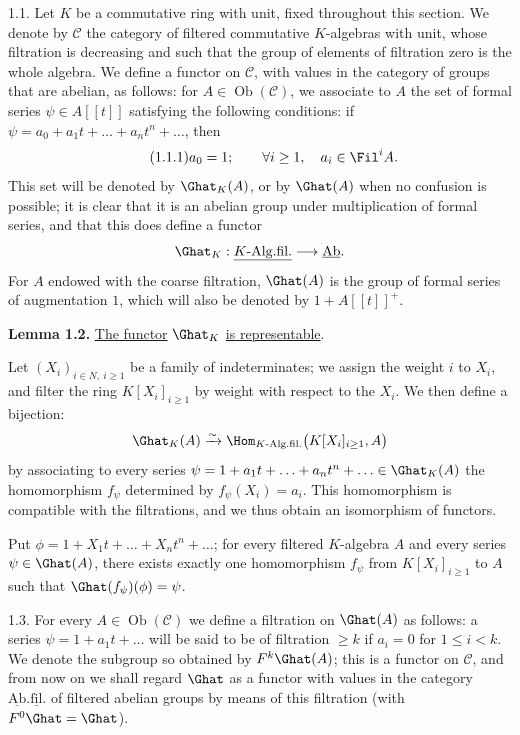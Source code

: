 1.1. Let \(K\) be a commutative ring with unit, fixed throughout this section. We denote by \(\mathcal C\) the category of filtered commutative \(K\)-algebras with unit, whose filtration is decreasing and such that the group of elements of filtration zero is the whole algebra. We define a functor on \(\mathcal C\), with values in the category of groups
%
that are abelian, as follows: for \(A\in\operatorname{Ob}(\mathcal C)\), we associate to \(A\) the set of formal series \(\psi\in A[[t]]\) satisfying the following conditions: if \(\psi=a_0+a_1t+\ldots+a_nt^n+\ldots\), then
\begin{equation}\tag{1.1.1}
  a_0=1;\qquad \forall i\geq 1,\quad a_i\in\Fil^i A .
\end{equation}
This set will be denoted by \(\Ghat_K(A)\), or by \(\Ghat(A)\) when no confusion is possible; it is clear that it is an abelian group under multiplication of formal series, and that this does define a functor
\[
  \Ghat_K:\underline{K\text{-Alg.fil.}}\longrightarrow \underline{\mathrm{Ab}}.
\]
For \(A\) endowed with the coarse filtration, \(\Ghat(A)\) is the group of formal series of augmentation \(1\), which will also be denoted by \(1+A[[t]]^+\).

\textbf{Lemma 1.2.} \uline{The functor} \(\Ghat_K\) \uline{is representable}.

Let \((X_i)_{i\in N,\ i\geq 1}\) be a family of indeterminates; we assign the weight \(i\) to \(X_i\), and filter the ring \(K[X_i]_{i\geq 1}\) by weight with respect to the \(X_i\). We then define a bijection:
\[
  \Ghat_K(A)\xrightarrow{\sim}
  \Hom_{K\text{-Alg.fil.}}\bigl(K[X_i]_{i\geq 1},A\bigr)
\]
by associating to every series \(\psi=1+a_1t+\ldots+a_nt^n+\ldots\in\Ghat_K(A)\) the homomorphism \(f_\psi\) determined by \(f_\psi(X_i)=a_i\). This homomorphism is compatible with the filtrations, and we thus obtain an isomorphism of functors.

Put \(\phi=1+X_1t+\ldots+X_nt^n+\ldots\); for every filtered \(K\)-algebra \(A\) and every series \(\psi\in\Ghat(A)\), there exists exactly one homomorphism
%
\(f_\psi\) from \(K[X_i]_{i\geq 1}\) to \(A\) such that \(\Ghat(f_\psi)(\phi)=\psi\).

1.3. For every \(A\in\operatorname{Ob}(\mathcal C)\) we define a filtration on \(\Ghat(A)\) as follows: a series \(\psi=1+a_1t+\ldots\) will be said to be of filtration \(\geq k\) if \(a_i=0\) for \(1\leq i<k\). We denote the subgroup so obtained by \(F^k\Ghat(A)\); this is a functor on \(\mathcal C\), and from now on we shall regard \(\Ghat\) as a functor with values in the category \(\underline{\mathrm{Ab}}.\underline{\mathrm{fil}}.\) of filtered abelian groups by means of this filtration (with \(F^0\Ghat=\Ghat\)).

